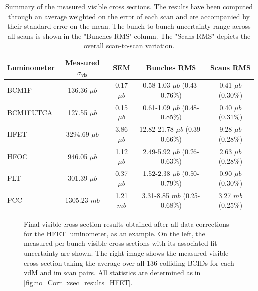 \begin{table}[!htb]
	\caption[Summary of visible cross sections results]{Summary of the measured visible cross sections. The results have been computed through an average weighted on the error of each scan and are accompanied by their standard error on the mean. The bunch-to-bunch uncertainty range across all scans is shown in the "Bunches RMS" column. The "Scans RMS" depicts the overall scan-to-scan variation. }
	
	\label{tab:xsec_summary}
	\centering
	\begin{tabular}{lcccc}
		\hline
		Luminometer & Measured $\sigma_\mathrm{vis}$ & SEM  & Bunches RMS & Scans RMS \\
		\hline
		BCM1F & 136.36 $\mu b$ & 0.17 $\mu b$ & 0.58-1.03 $\mu b$ (0.43-0.76\%) & 0.41 $\mu b$ (0.30\%) \\
		BCM1FUTCA & 127.55 $\mu b$ & 0.15 $\mu b$ & 0.61-1.09 $\mu b$ (0.48-0.85\%) & 0.40 $\mu b$ (0.31\%) \\
		HFET & 3294.69 $\mu b$ & 3.86 $\mu b$ & 12.82-21.78 $\mu b$ (0.39-0.66\%) & 9.28 $\mu b$ (0.28\%) \\
		HFOC & 946.05 $\mu b$ & 1.12 $\mu b$ & 2.49-5.92 $\mu b$ (0.26-0.63\%) & 2.63 $\mu b$ (0.28\%) \\
		PLT & 301.39 $\mu b$ & 0.37 $\mu b$ & 1.52-2.38 $\mu b$ (0.50-0.79\%) & 0.90 $\mu b$ (0.30\%) \\
		PCC & 1305.23 $mb$ & 1.21 $mb$ & 3.31-8.85 $mb$ (0.25-0.68\%) & 3.27 $mb$ (0.25\%) \\
		\hline
	\end{tabular}
\end{table}

\begin{figure}[!htb]
	\centering
	\caption[Final HFET visible cross section results]{Final visible cross section results obtained after all data corrections for the HFET luminometer, as an example. On the left, the measured per-bunch visible cross sections with its associated fit uncertainty are shown. The right image shows the measured visible cross section taking the average over all 136 colliding BCIDs for each vdM and im scan pairs. All statistics are determined as in \autoref{fig:no_Corr_xsec_results_HFET}.}
	\label{fig:all_Corr_xsec_results_HFET}
\end{figure}

